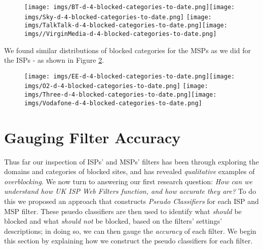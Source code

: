 \documentclass{bmcart}
\begin{document}
\begin{figure}[h!]
\caption{}
\texttt{[image: imgs/BT-d-4-blocked-categories-to-date.png]}\texttt{[image: imgs/Sky-d-4-blocked-categories-to-date.png]}
\texttt{[image: imgs/TalkTalk-d-4-blocked-categories-to-date.png]}\texttt{[image: imgs//VirginMedia-d-4-blocked-categories-to-date.png]}
\label{fig:broadband-blocked-categories}
\end{figure}

We found similar distributions of blocked categories for the MSPs as we did for the ISPs - as shown in Figure \ref{fig:mobile-blocked-categories}.

\begin{figure}[h!]
\caption{}
\texttt{[image: imgs/EE-d-4-blocked-categories-to-date.png]}\texttt{[image: imgs/O2-d-4-blocked-categories-to-date.png]}
\texttt{[image: imgs/Three-d-4-blocked-categories-to-date.png]}\texttt{[image: imgs/Vodafone-d-4-blocked-categories-to-date.png]}
\label{fig:mobile-blocked-categories}
\end{figure}


\section*{Gauging Filter Accuracy}
Thus far our inspection of ISPs' and MSPs' filters has been through exploring the domains and categories of blocked sites, and has revealed \textit{qualitative} examples of \textit{overblocking}.
We now turn to answering our first research question: \textit{How can we understand how UK ISP Web Filters function, and how accurate they are?}
To do this we proposed an approach that constructs \textit{Pseudo Classifiers} for each ISP and MSP filter.
These psuedo classifiers are then used to identify what \textit{should} be blocked and what \textit{should not} be blocked, based on the filters' settings' descriptions; in doing so, we can then gauge the \textit{accuracy} of each filter.
We begin this section by explaining how we construct the pseudo classifiers for each filter.
\end{document}
